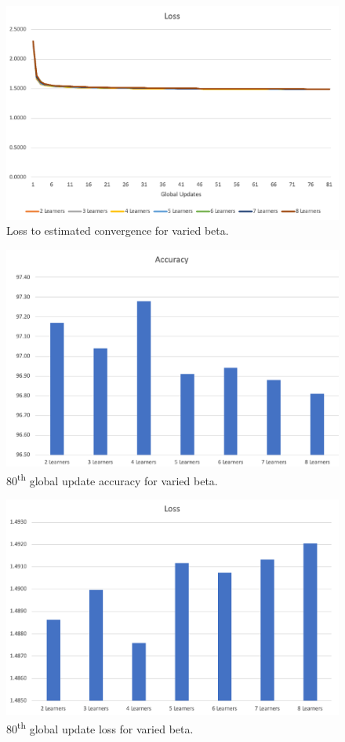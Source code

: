\documentclass[../mthe-493-final-project.tex]{subfiles}
\begin{document}
    \begin{figure}
        \centering
        \includegraphics[width=115mm]{thesis/img/res_10.png}
        \caption{Loss to estimated convergence for varied beta.}
        \label{fig:res_10}
    \end{figure}
    \begin{figure}
        \centering
        \includegraphics[width=150mm]{thesis/img/res_11.png}
        \caption{80\textsuperscript{th} global update accuracy for varied beta.}
        \label{fig:res_11}
    \end{figure}
    \begin{figure}
        \centering
        \includegraphics[width=150mm]{thesis/img/res_12.png}
        \caption{80\textsuperscript{th} global update loss for varied beta.}
        \label{fig:res_12}
    \end{figure}
\end{document}
